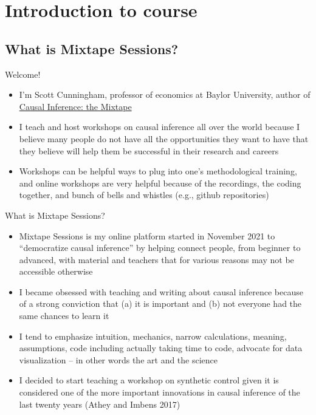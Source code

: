 \documentclass{beamer}
\begin{document}



   

\section{Introduction to course}

\subsection{What is Mixtape Sessions?}


\begin{frame}{Welcome!}

  \begin{itemize}
	\item I'm Scott Cunningham, professor of economics at Baylor University, author of \underline{Causal Inference: the Mixtape}
	\item I teach and host workshops on causal inference all over the world because I believe many people do not have all the opportunities they want to have that they believe will help them be successful in their research and careers 
	\item Workshops can be helpful ways to plug into one's methodological training, and online workshops are very helpful because of the recordings, the coding together, and bunch of bells and whistles (e.g., github repositories)
  \end{itemize}

\end{frame}



\begin{frame}{What is Mixtape Sessions?}

  \begin{itemize}
    \item Mixtape Sessions is my online platform started in November 2021 to ``democratize causal inference'' by helping connect people, from beginner to advanced, with material and teachers that for various reasons may not be accessible otherwise
    \item I became obsessed with teaching and writing about causal inference because of a strong conviction that (a) it is important and (b) not everyone had the same chances to learn it
    \item I tend to emphasize intuition, mechanics, narrow calculations, meaning, assumptions, code including actually taking time to code, advocate for data visualization -- in other words the art and the science
    \item I decided to start teaching a workshop on synthetic control given it is considered one of the more important innovations in causal inference of the last twenty years (Athey and Imbens 2017)
  \end{itemize}

\end{frame}
\end{document}
